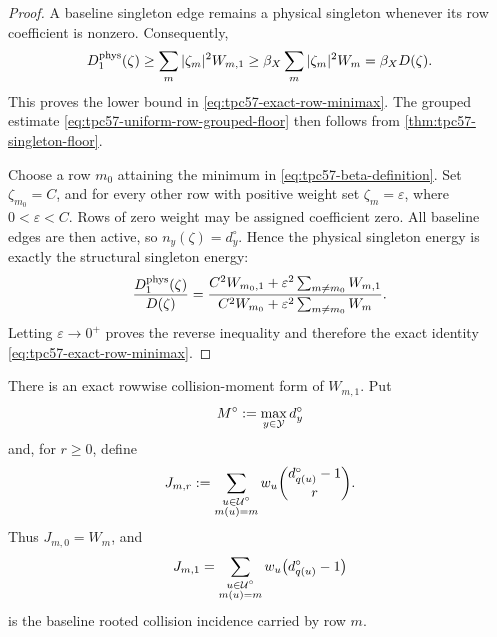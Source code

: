 \begin{proof}
A baseline singleton edge remains a physical singleton whenever its row
coefficient is nonzero.  Consequently,
\begin{equation}
 D_1^{\rm phys}(\zeta)
 \ge\sum_m|\zeta_m|^2W_{m,1}
 \ge\beta_X\sum_m|\zeta_m|^2W_m
 =\beta_XD(\zeta).
 \label{eq:tpc57-row-minimax-lower-proof}
\end{equation}
This proves the lower bound in
\eqref{eq:tpc57-exact-row-minimax}.  The grouped estimate
\eqref{eq:tpc57-uniform-row-grouped-floor} then follows from
\cref{thm:tpc57-singleton-floor}.

Choose a row \(m_0\) attaining the minimum in
\eqref{eq:tpc57-beta-definition}.  Set \(\zeta_{m_0}=C\), and for every
other row with positive weight set \(\zeta_m=\varepsilon\), where
\(0<\varepsilon<C\).  Rows of zero weight may be assigned coefficient zero.
All baseline edges are then active, so
\(n_y(\zeta)=d_y^\circ\).  Hence the physical singleton energy is exactly
the structural singleton energy:
\begin{equation}
 \frac{D_1^{\rm phys}(\zeta)}{D(\zeta)}
 =
 \frac{C^2W_{m_0,1}
       +\varepsilon^2\sum_{m\ne m_0}W_{m,1}}
      {C^2W_{m_0}
       +\varepsilon^2\sum_{m\ne m_0}W_m}.
 \label{eq:tpc57-row-minimax-extremizing-family}
\end{equation}
Letting \(\varepsilon\to0^+\) proves the reverse inequality and therefore
the exact identity \eqref{eq:tpc57-exact-row-minimax}.
\end{proof}

There is an exact rowwise collision-moment form of
\(W_{m,1}\).  Put
\begin{equation}
 M^\circ:=\max_{y\in\mathcal Y}d_y^\circ
 \label{eq:tpc57-max-baseline-degree}
\end{equation}
and, for \(r\ge0\), define
\begin{equation}
 J_{m,r}
 :=\sum_{\substack{u\in\mathcal U^\circ\\m(u)=m}}
 w_u\binom{d_{q(u)}^\circ-1}{r}.
 \label{eq:tpc57-row-collision-moments}
\end{equation}
Thus \(J_{m,0}=W_m\), and
\begin{equation}
 J_{m,1}
 =\sum_{\substack{u\in\mathcal U^\circ\\m(u)=m}}w_u
   \bigl(d_{q(u)}^\circ-1\bigr)
 \label{eq:tpc57-first-row-collision-moment}
\end{equation}
is the baseline rooted collision incidence carried by row \(m\).

